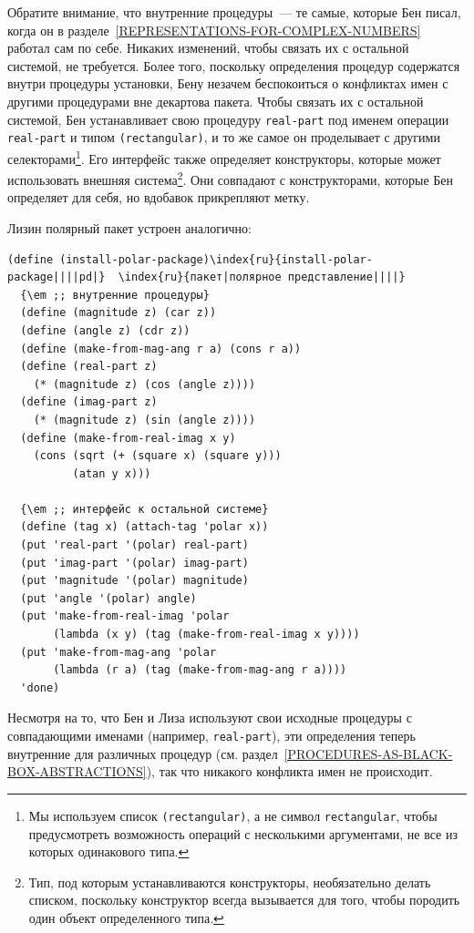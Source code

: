 Обратите внимание, что внутренние процедуры~--- те самые, 
которые Бен писал, когда он в разделе~\ref{REPRESENTATIONS-FOR-COMPLEX-NUMBERS} работал сам по себе.  
Никаких изменений, 
чтобы связать их с остальной системой, не требуется.  Более того,
поскольку определения процедур содержатся внутри процедуры установки,
Бену незачем беспокоиться о конфликтах имен с другими процедурами вне
декартова пакета.  Чтобы связать их с остальной системой, Бен
устанавливает свою процедуру {\tt real-part} под именем
операции {\tt real-part} и типом {\tt (rectangular)}, и
то же самое он проделывает с другими селекторами\footnote{Мы используем список {\tt (rectangular)}, а не
символ {\tt rectangular}, чтобы предусмотреть возможность
операций с несколькими аргументами, не все из которых одинакового 
типа.
}.
Его интерфейс также определяет конструкторы, которые может
использовать внешняя система\footnote{Тип, под которым устанавливаются конструкторы,
необязательно делать списком, поскольку конструктор всегда
вызывается для того, чтобы породить один объект определенного типа.
}.
Они совпадают с конструкторами, которые Бен определяет для себя, но
вдобавок прикрепляют метку.

Лизин полярный пакет устроен аналогично:

\begin{Verbatim}[fontsize=\small]
(define (install-polar-package)\index{ru}{install-polar-package||||pd|}  \index{ru}{пакет|полярное представление||||}
  {\em ;; внутренние процедуры}
  (define (magnitude z) (car z))
  (define (angle z) (cdr z))
  (define (make-from-mag-ang r a) (cons r a))
  (define (real-part z)
    (* (magnitude z) (cos (angle z))))
  (define (imag-part z)
    (* (magnitude z) (sin (angle z))))
  (define (make-from-real-imag x y) 
    (cons (sqrt (+ (square x) (square y)))
          (atan y x)))

  {\em ;; интерфейс к остальной системе}
  (define (tag x) (attach-tag 'polar x))
  (put 'real-part '(polar) real-part)
  (put 'imag-part '(polar) imag-part)
  (put 'magnitude '(polar) magnitude)
  (put 'angle '(polar) angle)
  (put 'make-from-real-imag 'polar
       (lambda (x y) (tag (make-from-real-imag x y))))
  (put 'make-from-mag-ang 'polar
       (lambda (r a) (tag (make-from-mag-ang r a))))
  'done)
\end{Verbatim}

Несмотря на то, что Бен и Лиза используют свои исходные
процедуры с совпадающими именами (например, {\tt real-part}),
эти определения теперь внутренние для различных процедур (см. 
раздел~\ref{PROCEDURES-AS-BLACK-BOX-ABSTRACTIONS}), так что
никакого конфликта имен не происходит.


